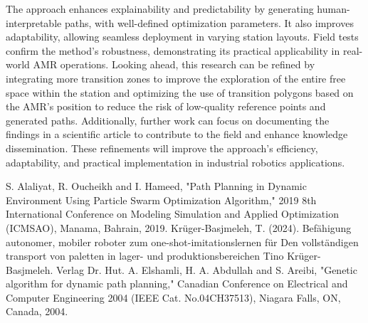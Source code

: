 \documentclass{amam}                %
\begin{document}
The approach enhances explainability and predictability by generating human-interpretable paths, with well-defined optimization parameters. It also improves adaptability, allowing seamless deployment in varying station layouts. Field tests confirm the method’s robustness, demonstrating its practical applicability in real-world AMR operations. Looking ahead, this research can be refined by integrating more transition zones to improve the exploration of the entire free space within the station and optimizing the use of transition polygons based on the AMR’s position to reduce the risk of low-quality reference points and generated paths. Additionally, further work can focus on documenting the findings in a scientific article to contribute to the field and enhance knowledge dissemination. These refinements will improve the approach’s efficiency, adaptability, and practical implementation in industrial robotics applications.

\begin{thebibliography}{9}
 S. Alaliyat, R. Oucheikh and I. Hameed, "Path Planning in Dynamic Environment Using Particle Swarm Optimization Algorithm," 2019 8th International Conference on Modeling Simulation and Applied Optimization (ICMSAO), Manama, Bahrain, 2019.
 Kr\"uger-Basjmeleh, T. (2024). Bef\"ahigung autonomer, mobiler roboter zum one-shot-imitationslernen f\"ur 
Den vollst\"andigen transport von paletten in lager- und produktionsbereichen Tino Kr\"uger-Basjmeleh. Verlag Dr. Hut.
 A. Elshamli, H. A. Abdullah and S. Areibi, "Genetic algorithm for dynamic path planning," Canadian Conference on Electrical and Computer Engineering 2004 (IEEE Cat. No.04CH37513), 
Niagara Falls, ON, Canada, 2004.
\end{thebibliography}
\end{document}
